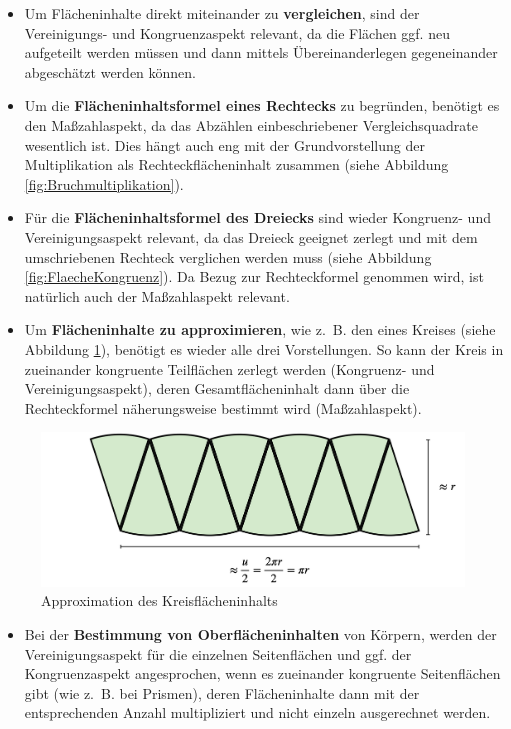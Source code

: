 \documentclass[
]{scrbook}
\providecommand{\tightlist}{%
  \setlength{\itemsep}{0pt}\setlength{\parskip}{0pt}}
\theoremstyle{definition}
\theoremstyle{definition}
\theoremstyle{definition}
\theoremstyle{definition}
\theoremstyle{remark}
\begin{document}
\begin{itemize}
\tightlist
\item
  Um Flächeninhalte direkt miteinander zu \textbf{vergleichen}, sind der Vereinigungs- und Kongruenzaspekt relevant, da die Flächen ggf. neu aufgeteilt werden müssen und dann mittels Übereinanderlegen gegeneinander abgeschätzt werden können.
\item
  Um die \textbf{Flächeninhaltsformel eines Rechtecks} zu begründen, benötigt es den Maßzahlaspekt, da das Abzählen einbeschriebener Vergleichsquadrate wesentlich ist. Dies hängt auch eng mit der Grundvorstellung der Multiplikation als Rechteckflächeninhalt zusammen (siehe Abbildung \ref{fig:Bruchmultiplikation}).
\item
  Für die \textbf{Flächeninhaltsformel des Dreiecks} sind wieder Kongruenz- und Vereinigungsaspekt relevant, da das Dreieck geeignet zerlegt und mit dem umschriebenen Rechteck verglichen werden muss (siehe Abbildung \ref{fig:FlaecheKongruenz}). Da Bezug zur Rechteckformel genommen wird, ist natürlich auch der Maßzahlaspekt relevant.
\item
  Um \textbf{Flächeninhalte zu approximieren}, wie z.~B. den eines Kreises (siehe Abbildung \ref{fig:FlaecheKreis}), benötigt es wieder alle drei Vorstellungen. So kann der Kreis in zueinander kongruente Teilflächen zerlegt werden (Kongruenz- und Vereinigungsaspekt), deren Gesamtflächeninhalt dann über die Rechteckformel näherungsweise bestimmt wird (Maßzahlaspekt).
\end{itemize}

\begin{figure}

{\centering \includegraphics[width=0.75\linewidth]{pictures/5-abb-Kreis} 

}

\caption{Approximation des Kreisflächeninhalts}\label{fig:FlaecheKreis}
\end{figure}

\begin{itemize}
\tightlist
\item
  Bei der \textbf{Bestimmung von Oberflächeninhalten} von Körpern, werden der Vereinigungsaspekt für die einzelnen Seitenflächen und ggf. der Kongruenzaspekt angesprochen, wenn es zueinander kongruente Seitenflächen gibt (wie z.~B. bei Prismen), deren Flächeninhalte dann mit der entsprechenden Anzahl multipliziert und nicht einzeln ausgerechnet werden.
\end{itemize}
\end{document}
